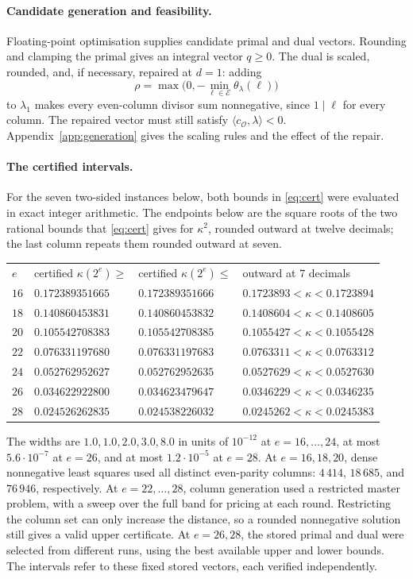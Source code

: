 \documentclass[11pt,a4paper]{article}
\theoremstyle{plain}
\theoremstyle{definition}
\theoremstyle{remark}
\newcommand{\vB}{\mathcal{E}}
\newcommand{\vR}{\mathcal{O}}
\begin{document}
\paragraph{Candidate generation and feasibility.}
Floating-point optimisation supplies candidate primal and dual vectors. Rounding and clamping the
primal gives an integral vector $q\ge0$. The dual is scaled, rounded, and, if necessary, repaired
at $d=1$: adding
\[
  \rho=\max\bigl(0,-\min_{\ell\in\vB}\theta_\lambda(\ell)\bigr)
\]
to $\lambda_1$ makes every even-column divisor sum nonnegative, since $1\mid\ell$ for every column.
The repaired vector must still satisfy $\langle c_{\vR},\lambda\rangle<0$.
Appendix~\ref{app:generation} gives the scaling rules and the effect of the repair.

\paragraph{The certified intervals.} For the seven two-sided instances below, both bounds in \eqref{eq:cert} were evaluated in exact
integer arithmetic. The endpoints below are the square roots of the two rational bounds that \eqref{eq:cert} gives for $\kappa^{2}$,
rounded outward at twelve decimals; the last column repeats them rounded outward at seven.
\begin{center}
\begin{tabular}{llll}
$e$ & certified $\kappa(2^{e})\ge$ & certified $\kappa(2^{e})\le$ & outward at $7$ decimals \\[2pt]
$16$ & $0.172389351665$ & $0.172389351666$ & $0.1723893<\kappa<0.1723894$ \\
$18$ & $0.140860453831$ & $0.140860453832$ & $0.1408604<\kappa<0.1408605$ \\
$20$ & $0.105542708383$ & $0.105542708385$ & $0.1055427<\kappa<0.1055428$ \\
$22$ & $0.076331197680$ & $0.076331197683$ & $0.0763311<\kappa<0.0763312$ \\
$24$ & $0.052762952627$ & $0.052762952635$ & $0.0527629<\kappa<0.0527630$ \\
$26$ & $0.034622922800$ & $0.034623479647$ & $0.0346229<\kappa<0.0346235$ \\
$28$ & $0.024526262835$ & $0.024538226032$ & $0.0245262<\kappa<0.0245383$ \\
\end{tabular}
\end{center}
The widths are $1.0,1.0,2.0,3.0,8.0$ in units of $10^{-12}$ at $e=16,\dots,24$, at most
$5.6\cdot10^{-7}$ at $e=26$, and at most $1.2\cdot10^{-5}$ at $e=28$.
At $e=16,18,20$, dense nonnegative least squares used all distinct even-parity columns:
$4\,414$, $18\,685$, and $76\,946$, respectively. At $e=22,\dots,28$, column generation used a
restricted master problem, with a sweep over the full band for pricing at each round.
Restricting the column set can only increase the distance, so a rounded nonnegative solution still
gives a valid upper certificate. At $e=26,28$, the stored primal and dual were selected from different
runs, using the best available upper and lower bounds. The intervals refer to these fixed stored
vectors, each verified independently.
\end{document}
